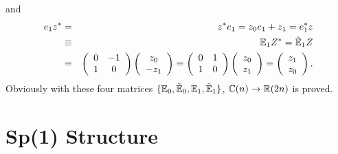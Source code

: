 \documentclass[a4paper,12pt]{book}
\begin{document}
and 
\begin{eqnarray}
e_{1}z^{*} &=&z^{*}e_{1}=z_{0}e_{1}+z_{1}=e_{1}^{*}z \\
&\equiv &\Bbb{E}_{1}Z^{*}=\tilde{\Bbb{E}}_{1}Z \\
&=&\left( 
\begin{array}{cc}
0 & -1 \\ 
1 & 0
\end{array}
\right) \left( 
\begin{array}{c}
z_{0} \\ 
-z_{1}
\end{array}
\right) =\left( 
\begin{array}{cc}
0 & 1 \\ 
1 & 0
\end{array}
\right) \left( 
\begin{array}{c}
z_{0} \\ 
z_{1}
\end{array}
\right) =\left( 
\begin{array}{c}
z_{1} \\ 
z_{0}
\end{array}
\right) .
\end{eqnarray}
Obviously with these four matrices $\{\Bbb{E}_{0},\tilde{\Bbb{E}}_{0},\Bbb{E}%
_{1},\tilde{\Bbb{E}}_{1}\}$, $\Bbb{C}(n)\rightarrow \Bbb{R}(2n)$ is proved.

\section{Sp(1) Structure}
\end{document}
